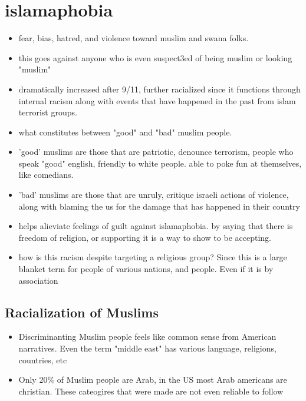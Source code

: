 \documentclass{article}
\begin{document}
\section{islamaphobia}
\begin{itemize}
  \item fear, bias, hatred, and violence toward muslim and swana folks.
  \item this goes against anyone who is even suspect3ed of being muslim or
    looking "muslim"
  \item dramatically increased after 9/11, further racialized since it
    functions through internal racism along with events that have happened
    in the past from islam terrorist groups.
  \item what constitutes between "good" and "bad" muslim people.
  \item 'good' muslims are those that are patriotic, denounce terrorism,
    people who speak "good" english, friendly to white people.
    able to poke fun at themselves, like comedians.
  \item 'bad' muslims are those that are unruly, critique israeli actions of violence,
    along with blaming the us for the damage that has happened in their country
  \item helps alieviate feelings of guilt against islamaphobia. by saying that there
    is freedom of religion, or supporting it is a way to show to be accepting.
  \item how is this racism despite targeting a religious group?
    Since this is a large blanket term for people of various nations,
    and people. Even if it is by association
\end{itemize}

\subsection{Racialization of Muslims}
\begin{itemize}
  \item Discriminanting Muslim people feels like common sense from American
    narratives.
    Even the term "middle east" has various language, religions, countries, etc
  \item Only 20\% of Muslim people are Arab, in the US most Arab americans are christian.
    These cateogires that were made are not even reliable to follow
\end{itemize}
\end{document}
